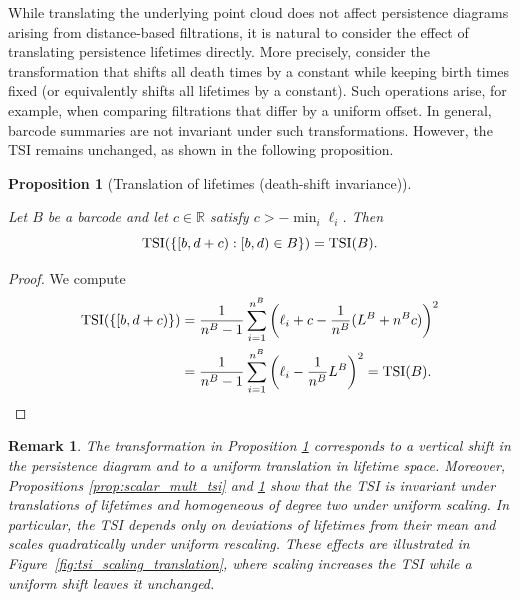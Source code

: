\documentclass[11pt]{amsart}
\newtheorem*{remark}{Remark}
\newtheorem{prop}{Proposition}[section]
\theoremstyle{definition}
\newcommand{\tsi}[0]{\textup{TSI}}
\begin{document}
While translating the underlying point cloud does not affect persistence diagrams arising from distance-based filtrations, it is natural to consider the effect of translating persistence lifetimes directly. More precisely, consider the transformation that shifts all death times by a constant while keeping birth times fixed (or equivalently shifts all lifetimes by a constant). Such operations arise, for example, when comparing filtrations that differ by a uniform offset. In general, barcode summaries are not invariant under such transformations. However, the TSI remains unchanged, as shown in the following proposition.

\begin{prop}[Translation of lifetimes (death-shift invariance)]\label{prop:length_translate_tsi}

Let $B$ be a barcode and let $c\in\mathbb{R}$ satisfy $c>-\min_i \ell_i$. Then
\begin{equation}
\tsi(\{[b,d+c):[b,d)\in B\})=\tsi(B).
\end{equation}
\end{prop}

\begin{proof}
We compute
\begin{align*}
\tsi(\{[b,d+c)\})
&=\frac{1}{n^B-1}\sum_{i=1}^{n^B}\left(\ell_i+c-\frac{1}{n^B}(L^B+n^Bc)\right)^2\\
&=\frac{1}{n^B-1}\sum_{i=1}^{n^B}\left(\ell_i-\frac{1}{n^B}L^B\right)^2
=\tsi(B).
\end{align*}
\end{proof}



\begin{remark}\rm 
The transformation in Proposition \ref{prop:length_translate_tsi} corresponds to a vertical shift in the persistence diagram and to a uniform translation in lifetime space. Moreover, Propositions \ref{prop:scalar_mult_tsi} and \ref{prop:length_translate_tsi} show that the TSI is invariant under translations of lifetimes and homogeneous of degree two under uniform scaling. In particular, the TSI depends only on deviations of lifetimes from their mean and scales quadratically under uniform rescaling. These effects are illustrated in Figure~\ref{fig:tsi_scaling_translation}, where scaling increases the TSI while a uniform shift leaves it unchanged.
\end{remark}
\end{document}
